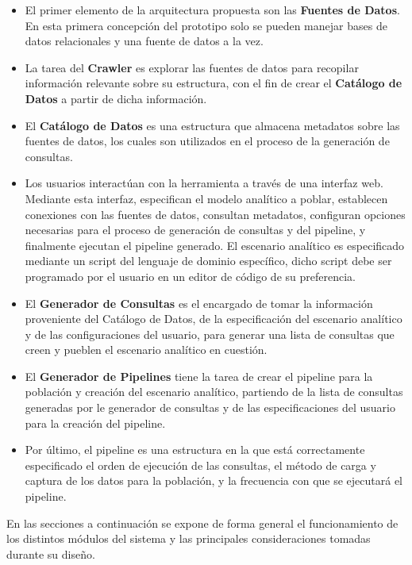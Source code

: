 \begin{itemize}
    \item El primer elemento de la arquitectura propuesta son las \textbf{Fuentes de Datos}. En esta primera concepción del 
        prototipo solo se pueden manejar bases de datos relacionales y una fuente de datos a la vez.
    \item La tarea del \textbf{Crawler} es explorar las fuentes de datos para recopilar información relevante sobre su estructura, 
        con el fin de crear el \textbf{Catálogo de Datos} a partir de dicha información.
    \item El \textbf{Catálogo de Datos} es una estructura que almacena metadatos sobre las fuentes de datos, los cuales son 
        utilizados en el proceso de la generaci\'on de consultas.
    \item Los usuarios interactúan con la herramienta a través de una interfaz web. Mediante esta interfaz, especifican el modelo 
        analítico a poblar, establecen conexiones con las fuentes de datos, consultan metadatos, configuran opciones necesarias 
        para el proceso de generación de consultas y del pipeline, y finalmente ejecutan el pipeline generado. El escenario analítico 
        es especificado mediante un script del lenguaje de dominio espec\'ifico, dicho script debe ser programado por el usuario en 
        un editor de c\'odigo de su preferencia.
    \item El \textbf{Generador de Consultas} es el encargado de tomar la información proveniente del Catálogo de Datos, de la especificaci\'on
        del escenario analítico y de las configuraciones del usuario, para generar una lista de consultas que creen y pueblen el escenario 
        analítico en cuesti\'on.
    \item El \textbf{Generador de Pipelines} tiene la tarea de crear el pipeline para la población y creaci\'on del escenario analítico, partiendo 
        de la lista de consultas generadas por le generador de consultas y de las especificaciones del usuario para la creaci\'on del pipeline.
    \item Por \'ultimo, el pipeline es una estructura en la que est\'a correctamente especificado el orden de ejecuci\'on de las consultas, 
        el m\'etodo de carga y captura de los datos para la población, y la frecuencia con que se ejecutar\'a el pipeline.
\end{itemize}

En las secciones a continuación se expone de forma general el funcionamiento de
los distintos módulos del sistema y las principales consideraciones tomadas durante
su diseño.

